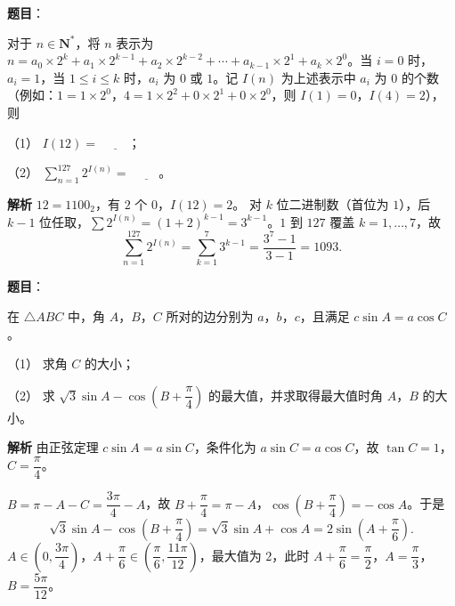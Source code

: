 \begin{answer}

\textbf{题目}：

对于 $n\in\mathbf N^*$，将 $n$ 表示为 $n=a_0\times2^k+a_1\times2^{k-1}+a_2\times2^{k-2}+\cdots+a_{k-1}\times2^1+a_k\times2^0$。当 $i=0$ 时，$a_i=1$，当 $1\leqslant i\leqslant k$ 时，$a_i$ 为 $0$ 或 $1$。记 $I(n)$ 为上述表示中 $a_i$ 为 $0$ 的个数（例如：$1=1\times2^0$，$4=1\times2^2+0\times2^1+0\times2^0$，则 $I(1)=0$，$I(4)=2$），则

（1） $I(12)=$ $\underline{\qquad}$；

（2） $\sum\limits_{n=1}^{127}2^{I(n)}=$ $\underline{\qquad}$。

\textbf{解析}
$12=1100_2$，有 $2$ 个 $0$，$I(12)=2$。
对 $k$ 位二进制数（首位为 $1$），后 $k-1$ 位任取，$\sum2^{I(n)}=(1+2)^{k-1}=3^{k-1}$。$1$ 到 $127$ 覆盖 $k=1,\dots,7$，故
\nopagebreak[4]
\[\sum_{n=1}^{127}2^{I(n)}=\sum_{k=1}^7 3^{k-1}=\frac{3^7-1}{3-1}=1093.\]



\end{answer}
\begin{answer}

\textbf{题目}：

在 $\triangle ABC$ 中，角 $A$，$B$，$C$ 所对的边分别为 $a$，$b$，$c$，且满足 $c\sin A=a\cos C$。

（1） 求角 $C$ 的大小；

（2） 求 $\sqrt3\sin A-\cos\left(B+\dfrac\pi4\right)$ 的最大值，并求取得最大值时角 $A$，$B$ 的大小。

\textbf{解析}
由正弦定理 $c\sin A=a\sin C$，条件化为 $a\sin C=a\cos C$，故 $\tan C=1$，$C=\dfrac\pi4$。

$B=\pi-A-C=\dfrac{3\pi}4-A$，故 $B+\dfrac\pi4=\pi-A$，$\cos(B+\dfrac\pi4)=-\cos A$。于是
\nopagebreak[4]
\[\sqrt3\sin A-\cos\left(B+\frac\pi4\right)=\sqrt3\sin A+\cos A=2\sin\left(A+\frac\pi6\right).\]
$A\in\left(0,\dfrac{3\pi}4\right)$，$A+\dfrac\pi6\in\left(\dfrac\pi6,\dfrac{11\pi}{12}\right)$，最大值为 $2$，此时 $A+\dfrac\pi6=\dfrac\pi2$，$A=\dfrac\pi3$，$B=\dfrac{5\pi}{12}$。



\end{answer}
